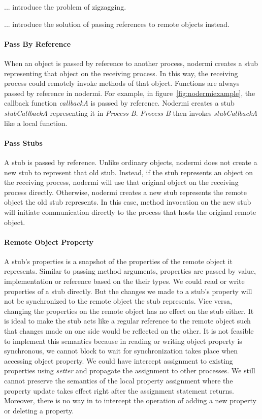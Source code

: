 ... introduce the problem of zigzagging.

... introduce the solution of passing references to remote objects instead.

\paragraph{Pass By Reference}
When an object is passed by reference to another process,
nodermi creates a stub representing that object on the receiving process.
In this way,
the receiving process could remotely invoke methods of that object.
Functions are always passed by reference in nodermi.
For example, in figure~\ref{fig:nodermiexample}, the callback function
\emph{callbackA} is passed by reference. Nodermi creates
a stub \emph{stubCallbackA} representing it in \emph{Process B}.
\emph{Process B} then invokes \emph{stubCallbackA} like a local function.

\paragraph{Pass Stubs}
A stub is passed by reference. Unlike ordinary objects,
nodermi does not create a new stub to represent that old
stub.
Instead, if the stub represents an object on the receiving
process, nodermi will use that original object on the receiving
process directly.
Otherwise, nodermi creates a new stub represents
the remote object the old stub represents.
In this case, method invocation on the new stub will
initiate communication directly to the process that
hosts the original remote object.



\paragraph{Remote Object Property}
A stub's properties is a snapshot of the properties
of the remote object it represents.
Similar to passing method arguments,
properties are passed by value, implementation or reference
based on the their types.
We could read or write properties of a stub directly.
But the changes we made to a stub's property
will not be synchronized to the remote object the stub represents.
Vice versa,
changing the properties on the remote object has no effect
on the stub either.
It is ideal to make the stub acts like a regular reference
to the remote object such that
changes made on one side would be reflected on the other.
It is not feasible to implement this semantics because
in \js{} reading or writing object property is synchronous,
we cannot block to wait for synchronization takes place
 when accessing object property.
We could have intercept assignment to existing properties using
\emph{setter} and propagate the assignment to other processes.
We still cannot preserve the semantics of the local property assignment
where the property update takes effect right after the assignment statement returns.
Moreover, there is no way in \js{} to intercept the operation of
adding a new property or deleting a property.



